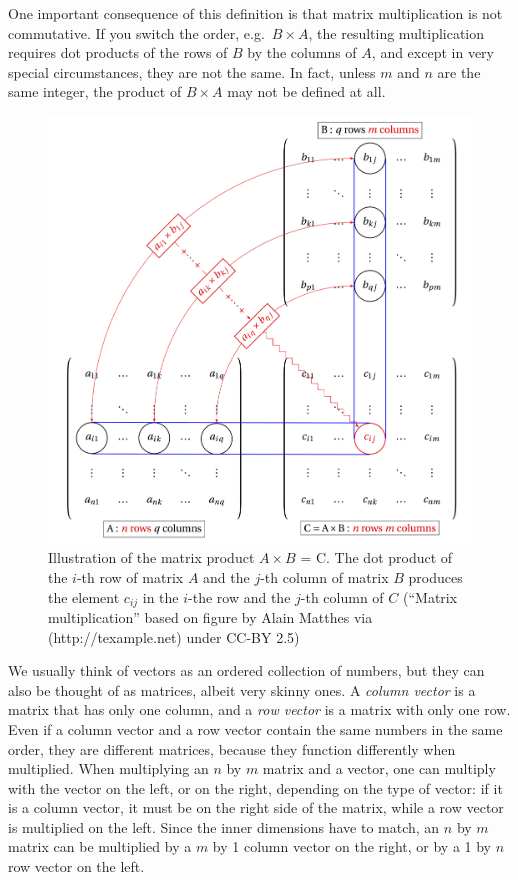\documentclass[
  letterpaper,
  DIV=11,
  numbers=noendperiod]{scrreprt}
\begin{document}
One important consequence of this definition is that matrix
multiplication is not commutative. If you switch the order,
e.g.~\(B \times A\), the resulting multiplication requires dot products
of the rows of \(B\) by the columns of \(A\), and except in very special
circumstances, they are not the same. In fact, unless \(m\) and \(n\)
are the same integer, the product of \(B \times A\) may not be defined
at all.

\begin{figure}

{\centering \includegraphics{./ch11/matrix_multiplication_tikz.png}

}

\caption{Illustration of the matrix product \(A \times B\) = C. The dot
product of the \(i\)-th row of matrix \(A\) and the \(j\)-th column of
matrix \(B\) produces the element \(c_{ij}\) in the \(i\)-the row and
the \(j\)-th column of \(C\) (``Matrix multiplication'' based on figure
by Alain Matthes via (http://texample.net) under CC-BY 2.5)}

\end{figure}

We usually think of vectors as an ordered collection of numbers, but
they can also be thought of as matrices, albeit very skinny ones. A
\emph{column vector} is a matrix that has only one column, and a
\emph{row vector} is a matrix with only one row. Even if a column vector
and a row vector contain the same numbers in the same order, they are
different matrices, because they function differently when multiplied.
When multiplying an \(n\) by \(m\) matrix and a vector, one can multiply
with the vector on the left, or on the right, depending on the type of
vector: if it is a column vector, it must be on the right side of the
matrix, while a row vector is multiplied on the left. Since the inner
dimensions have to match, an \(n\) by \(m\) matrix can be multiplied by
a \(m\) by 1 column vector on the right, or by a 1 by \(n\) row vector
on the left.
\end{document}
